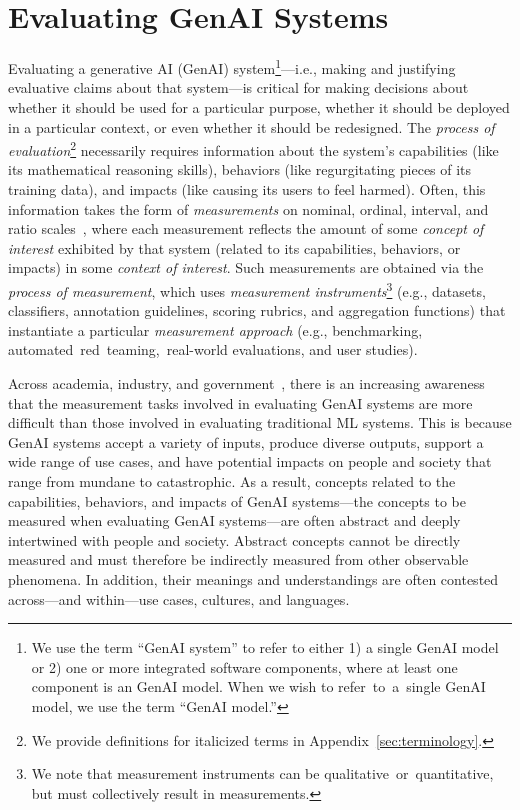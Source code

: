 \documentclass{article}
\begin{document}
\section{Evaluating GenAI Systems}

Evaluating a generative AI (GenAI) system\footnote{We use the term ``GenAI system'' to refer to either 1) a single GenAI model or 2) one or more integrated software components, where at least one component is an GenAI model. When we wish to refer~to~a~single GenAI model, we use the term ``GenAI model.''}---i.e., making and justifying evaluative claims about that system---is critical for making
decisions about whether it should be used for a particular purpose, whether it should be deployed in a particular context, or even whether it should be redesigned. The \emph{process of evaluation}\footnote{We provide definitions for italicized terms in   Appendix~\ref{sec:terminology}.}  necessarily requires 
information about the system's
capabilities
(like its mathematical reasoning skills), behaviors (like regurgitating pieces of its training data), and impacts (like causing its users to feel harmed). Often, this information takes the form of \emph{measurements} on nominal, ordinal, interval, and ratio scales~\cite{hand2004measurement}, where each measurement reflects the amount of some \emph{concept of interest} exhibited by that system (related to its capabilities, behaviors, or impacts) in some \emph{context of interest}. Such  measurements are obtained via the \emph{process of measurement}, which uses \emph{measurement instruments}\footnote{We note that measurement instruments can be qualitative~or~quantitative, but must collectively result in measurements.} (e.g., datasets, classifiers, annotation guidelines, scoring rubrics, and aggregation functions) that instantiate a particular \emph{measurement approach} (e.g., benchmarking, automated~red~teaming,~real-world evaluations, and user studies).

Across academia, industry, and government~\citep[e.g.,][]{nistairmf, cooper2023genlaw, perez2022redteaminglanguagemodels,weidinger2023safetyeval}, there is an increasing awareness that the measurement tasks involved in evaluating GenAI systems are more difficult than those involved in evaluating traditional ML systems. This is because GenAI systems accept a variety of inputs, produce diverse outputs, support a wide range of use cases, and have potential impacts on people and society that range from mundane to catastrophic. As a result, concepts related to the capabilities, behaviors, and impacts of GenAI systems---the concepts to be measured when evaluating GenAI systems---are often abstract and deeply intertwined with people and society. Abstract concepts cannot be directly measured and must therefore be indirectly measured from other observable phenomena. In addition, their
meanings and understandings are often contested~\citep[e.g.,][]{mulligan2016privacy, mulliganfairness} across---and within---use cases, cultures, and languages. 
\end{document}
